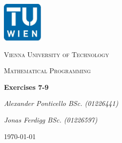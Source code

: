 
\begin{titlepage}
	\centering
	\includegraphics[width=0.15\textwidth]{./img/logo_tuwien.png}\par\vspace{1cm}
	{\scshape\LARGE Vienna University of Technology \par}
	\vspace{1cm}
	{\scshape\Large Mathematical Programming \par}
	\vspace{1.5cm}
	{\huge\bfseries Exercises 7-9  \par}
	\vspace{2cm}
	{\Large\itshape Alexander Ponticello BSc. (01226441) \par}
	{\Large\itshape Jonas Ferdigg BSc. (01226597) \par}
	\vfill
	\vspace*{1ex}
	{\large \today\par}
\end{titlepage}

